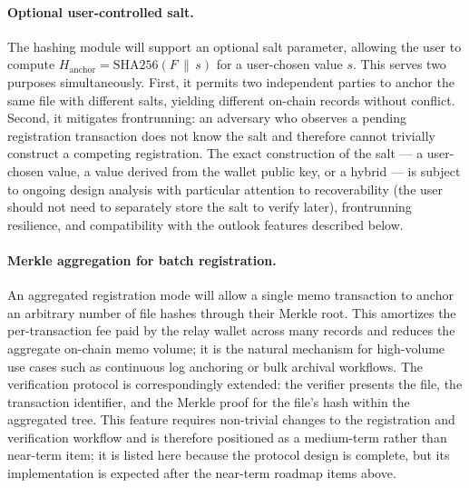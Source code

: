 \documentclass[11pt,a4paper]{article}
\begin{document}
\paragraph{Optional user-controlled salt.} The hashing module will
support an optional salt parameter, allowing the user to compute
$H_{\text{anchor}} = \mathrm{SHA256}(F \,\|\, s)$ for a user-chosen
value $s$. This serves two purposes simultaneously. First, it permits
two independent parties to anchor the same file with different salts,
yielding different on-chain records without conflict. Second, it
mitigates frontrunning: an adversary who observes a pending
registration transaction does not know the salt and therefore cannot
trivially construct a competing registration. The exact construction
of the salt --- a user-chosen value, a value derived from the wallet
public key, or a hybrid --- is subject to ongoing design analysis with
particular attention to recoverability (the user should not need to
separately store the salt to verify later), frontrunning resilience,
and compatibility with the outlook features described below.

\paragraph{Merkle aggregation for batch registration.} An aggregated
registration mode will allow a single memo transaction to anchor an
arbitrary number of file hashes through their Merkle root. This
amortizes the per-transaction fee paid by the relay wallet across many
records and reduces the aggregate on-chain memo volume; it is the
natural mechanism for high-volume use cases such as continuous log
anchoring or bulk archival workflows. The verification protocol is
correspondingly extended: the verifier presents the file, the
transaction identifier, and the Merkle proof for the file's hash
within the aggregated tree. This feature requires non-trivial changes
to the registration and verification workflow and is therefore
positioned as a medium-term rather than near-term item; it is listed
here because the protocol design is complete, but its implementation
is expected after the near-term roadmap items above.
\end{document}
